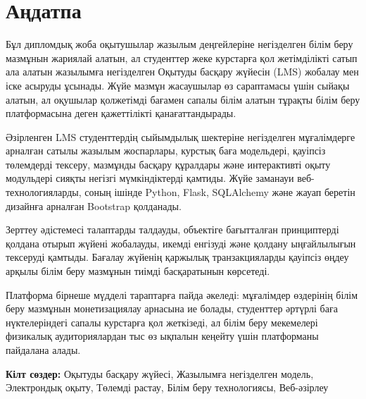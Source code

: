 \newpage
\section*{Аңдатпа}
\thispagestyle{empty}

Бұл дипломдық жоба оқытушылар жазылым деңгейлеріне негізделген білім беру мазмұнын жариялай алатын, ал студенттер жеке курстарға қол жетімділікті сатып ала алатын жазылымға негізделген Оқытуды басқару жүйесін (LMS) жобалау мен іске асыруды ұсынады. Жүйе мазмұн жасаушылар өз сараптамасы үшін сыйақы алатын, ал оқушылар қолжетімді бағамен сапалы білім алатын тұрақты білім беру платформасына деген қажеттілікті қанағаттандырады.

Әзірленген LMS студенттердің сыйымдылық шектеріне негізделген мұғалімдерге арналған сатылы жазылым жоспарлары, курстық баға модельдері, қауіпсіз төлемдерді тексеру, мазмұнды басқару құралдары және интерактивті оқыту модульдері сияқты негізгі мүмкіндіктерді қамтиды. Жүйе заманауи веб-технологияларды, соның ішінде Python, Flask, SQLAlchemy және жауап беретін дизайнға арналған Bootstrap қолданады.

Зерттеу әдістемесі талаптарды талдауды, объектіге бағытталған принциптерді қолдана отырып жүйені жобалауды, икемді енгізуді және қолдану ыңғайлылығын тексеруді қамтыды. Бағалау жүйенің қаржылық транзакцияларды қауіпсіз өңдеу арқылы білім беру мазмұнын тиімді басқаратынын көрсетеді.

Платформа бірнеше мүдделі тараптарға пайда әкеледі: мұғалімдер өздерінің білім беру мазмұнын монетизациялау арнасына ие болады, студенттер әртүрлі баға нүктелеріндегі сапалы курстарға қол жеткізеді, ал білім беру мекемелері физикалық аудиториялардан тыс өз ықпалын кеңейту үшін платформаны пайдалана алады.

\textbf{Кілт сөздер:} Оқытуды басқару жүйесі, Жазылымға негізделген модель, Электрондық оқыту, Төлемді растау, Білім беру технологиясы, Веб-әзірлеу